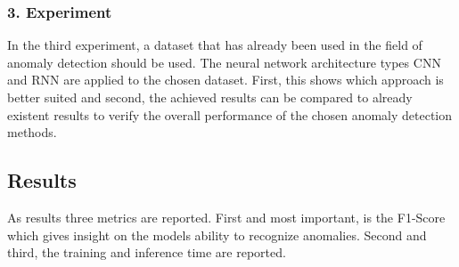 \subsubsection{3. Experiment}
In the third experiment, a dataset that has already been used in the field of anomaly detection should be used. The neural network architecture types CNN and RNN are applied to the chosen dataset. First, this shows which approach is better suited and second, the achieved results can be compared to already existent results to verify the overall performance of the chosen anomaly detection methods.

\subsection{Results}
As results three metrics are reported. First and most important, is the F1-Score which gives insight on the models ability to recognize anomalies. Second and third, the training and inference time are reported.



 
